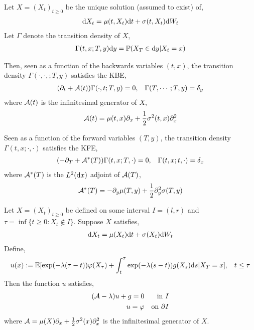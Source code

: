 \documentclass[12pt]{article}
\begin{document}
\begin{theorem}
Let \( X = (X_t)_{t\geq 0} \) be the unique solution (assumed to exist) of,
\begin{align*}
    \mathrm{d} X_t = \mu(t,X_t) \mathrm{d} t + \sigma(t,X_t) \mathrm{d} W_t
\end{align*}
Let \( \Gamma \) denote the transition density of \( X \),
\begin{align*}
    \Gamma(t,x;T,y) \mathrm{d} y = \mathbb{P}(X_T\in \mathrm{d} y | X_t = x)
\end{align*}

Then, seen as a function of the backwards variables \( (t,x) \), the transition density \( \Gamma(\cdot, \cdot,;T,y) \) satisfies the KBE,
\begin{align*}
    (\partial_t+\mathcal{A}(t))\Gamma(\cdot, t; T,y) = 0, && \Gamma(T,\cdots; T,y) = \delta_y
\end{align*}
where \( \mathcal{A}(t) \) is the infinitesimal generator of \( X \),
\begin{align*}
    \mathcal{A}(t) = \mu(t,x)\partial_x + \frac{1}{2}\sigma^2(t,x)\partial_x^2
\end{align*}

Seen as a function of the forward variables \( (T,y) \), the transition density \( \Gamma(t,x;\cdot,\cdot) \) satisfies the KFE,
\begin{align*}
    (-\partial_T+\mathcal{A}^*(T))\Gamma(t,x;T,\cdot) = 0, && \Gamma(t,x;t,\cdot) = \delta_x
\end{align*}
where \( \mathcal{A}^*(T) \) is the \( L^2(\mathrm{d} x) \) adjoint of \( \mathcal{A}(T) \),
\begin{align*}
    \mathcal{A}^*(T) = -\partial_y \mu(T,y) + \frac{1}{2}\partial_y^2 \sigma(T,y)
\end{align*}
\end{theorem}

\begin{theorem}
    Let \( X = (X_t)_{t\geq 0} \) be defined on some interval \( I = (l,r) \) and \( \tau = \operatorname{inf}\{t \geq 0 : X_t \notin I\} \). Suppose \( X \) satisfies,
\begin{align*}
    \mathrm{d} X_t = \mu(X_t) \mathrm{d} t + \sigma(X_t)\mathrm{d} W_t
\end{align*}
Define,
\begin{align*}
    u(x) := \mathbb{E}[\exp(-\lambda(\tau-t))\varphi(X_\tau) + \int_t^\tau \exp(-\lambda(s-t))g(X_s)\mathrm{d} s | X_T = x], && t\leq \tau
\end{align*}
Then the function \( u \) satisfies,
\begin{align*}
    (\mathcal{A} - \lambda)u + g = 0 && \text{in } I \\
    u = \varphi && \text{on } \partial I
\end{align*}
    where \( \mathcal{A} = \mu(X)\partial_x + \frac{1}{2} \sigma^2(x)\partial_x^2 \) is the infinitesimal generator of \( X \).
\end{theorem}
\end{document}
